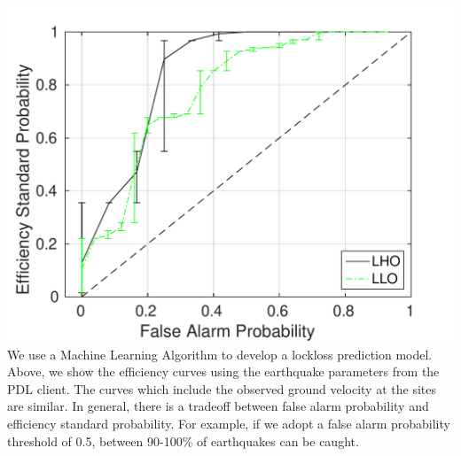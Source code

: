 \documentclass[a0paper,portrait]{baposter}
\begin{document}
\begin{poster}
{ \includegraphics[width=0.99\linewidth]{plots/lockloss_fap_errorbars.pdf}
We use a Machine Learning Algorithm to develop a lockloss prediction model. 
Above, we show the efficiency curves using the earthquake parameters from the PDL client.
The curves which include the observed ground velocity at the sites are similar. 
In general, there is a tradeoff between false alarm probability and efficiency standard probability.
For example, if we adopt a false alarm probability threshold of 0.5, between 90-100\% of earthquakes can be caught.
	
}

\end{poster}
\end{document}
